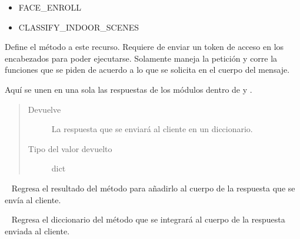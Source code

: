 \begin{fulllineitems}
\begin{fulllineitems}
\begin{itemize}
\item {} 
FACE\_ENROLL

\item {} 
CLASSIFY\_INDOOR\_SCENES

\end{itemize}

\begin{fulllineitems}
\label{\detokenize{chapter_two/desc_cloudnao:app.resources.vision.Vision.post}}
Define el método  a este recurso. Requiere de enviar un token
de acceso en los encabezados para poder ejecutarse. Solamente maneja la
petición y corre la funciones que se piden de acuerdo a lo que se
solicita en el cuerpo del mensaje.

Aquí se unen en una sola las respuestas de los módulos dentro de
 y .
\begin{quote}\begin{description}
\item[{Devuelve}] \leavevmode
La respuesta que se enviará al cliente en un diccionario.

\item[{Tipo del valor devuelto}] \leavevmode
dict

\end{description}\end{quote}

\end{fulllineitems}


\end{fulllineitems}


\begin{fulllineitems}
\label{\detokenize{chapter_two/desc_cloudnao:app.resources.vision.classify_indoor_scenes}}~
Regresa el resultado del método 
para añadirlo al cuerpo de la respuesta que se envía al cliente.

\end{fulllineitems}


\begin{fulllineitems}
\label{\detokenize{chapter_two/desc_cloudnao:app.resources.vision.face_enroll}}~
Regresa el diccionario del método
{\hyperref[\detokenize{chapter_two/desc_cloudnao:app.tpa_client_libraries.kairos_client.Kairos.enroll}]{}}
que se integrará al cuerpo de la respuesta enviada al cliente.


\end{fulllineitems}
\end{fulllineitems}
